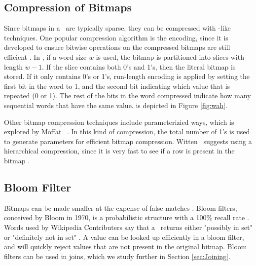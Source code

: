 \subsection{Compression of Bitmaps}
\label{sub:Compression of Bitmaps}
Since bitmaps in a \biti~are typically sparse, they can be compressed with \rle-like techniques. One popular compression algorithm is the  encoding, since it is developed to ensure bitwise operations on the compressed bitmaps are still efficient \cite{Bjorklund2011-wh}. In , if a word size $w$ is used, the bitmap is partitioned into slices with length $w-1$. If the slice contains both 0's and 1's, then the literal bitmap is stored. If it only contains 0's or 1's, run-length encoding is applied by setting the first bit in the word to 1, and the second bit indicating which value that is repeated (0 or 1). The rest of the bits in the word compressed indicate how many sequential words that have the same value.  is depicted in Figure \ref{fig:wah}.

Other bitmap compression techniques include parameterizied ways, which is explored by Moffat \ea~\cite{Moffat1992-tz}. In this kind of compression, the total number of 1's is used to generate parameters for efficient bitmap compression. Witten \ea~suggests using a hierarchical compression, since it is very fast to see if a row is present in the bitmap \cite{Witten1999-qq}. 


\subsection{Bloom Filter}
\label{sub:Bloom Filter}
Bitmaps can be made smaller at the expense of false matches \cite{Witten1999-qq}. Bloom filters, conceived by Bloom in 1970, is a probabilistic structure with a 100\% recall rate \cite{Bloom1970-nr, Wikipedia_contributors2015-lq}. Words used by Wikipedia Contributers say that a \bloom~returns either "possibly in set" or "definitely not in set" \cite{Wikipedia_contributors2015-lq}. A value can be looked up efficiently in a bloom filter, and will quickly reject values that are not present in the original bitmap. Bloom filters can be used in joins, which we study further in Section \ref{sec:Joining}.

